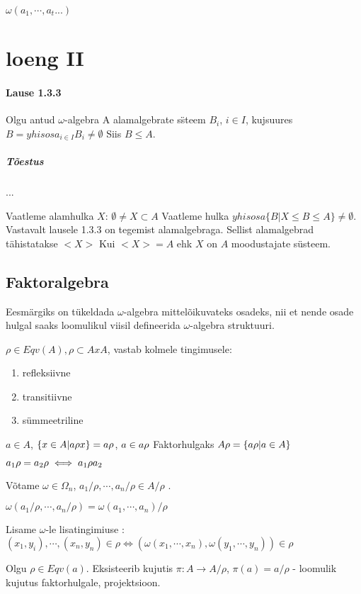 \documentclass[12pt]{article}
\begin{document}
$\omega(a_1,\cdots,a_t ...)$ 
 
 
\section{loeng II}

\paragraph{Lause 1.3.3} Olgu antud $\omega$-algebra A alamalgebrate s\"steem $B_i$, $i \in I$, kujsuures $B= yhisosa_{i \in I} B_i \neq \emptyset$ Siis $B \leq A$.

\subparagraph*{Tõestus}

...

Vaatleme alamhulka $X$:
$\emptyset \neq X \subset A$
Vaatleme hulka $yhisosa \{ B | X \leq B \leq A \} \neq \emptyset$. Vastavalt lausele 1.3.3 on tegemist alamalgebraga. Sellist alamalgebrad tähistatakse $<X>$
Kui $<X> = A$ ehk $X$ on $A$ moodustajate s\"usteem.

\subsection{Faktoralgebra}

Eesmärgiks on t\"ukeldada $\omega$-algebra mittelõikuvateks osadeks, nii et nende osade hulgal saaks loomulikul viisil defineerida $\omega$-algebra struktuuri. 

$\rho \in Eqv(A), \rho \subset A x A $, vastab kolmele tingimusele:
\begin{enumerate}
\item refleksiivne
\item transitiivne
\item s\"ummeetriline
\end{enumerate}
$a \in A$, $\{x \in A | a \rho x \} = a \/ \rho$, $a \in a \/ \rho$ Faktorhulgaks $A \/ \rho = \{ a \/ \rho | a \in A \}$ 

$a_1 \/ \rho = a_2 \/ \rho \iff a_1 \rho a_2$

Võtame $\omega \in \Omega_n$, $a_1 / \rho , \cdots , a_n / \rho \in A / \rho$ .

$\omega(a_1 / \rho , \cdots , a_n / \rho) = \omega(a_1,\cdots,a_n)/ \rho$

Lisame $\omega$-le lisatingimiuse : $(x_1,y_i),\cdots, (x_n,y_n)  \in \rho \iff ( \omega(x_1, \cdots , x_n), \omega(y_1,\cdots,y_n)) \in \rho$

Olgu $\rho \in Eqv(a)$.
Eksisteerib kujutis $ \pi : A \rightarrow A/ \rho$, $\pi (a) = a / \rho $ - loomulik kujutus faktorhulgale, projektsioon.
\end{document}
